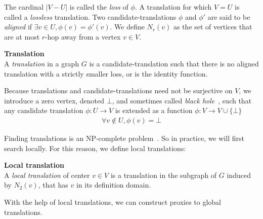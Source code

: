 The cardinal $|V-U|$ is called the \emph{loss} of $\phi$.
A translation for which $V=U$ is called a \emph{lossless} translation.
Two candidate-translations $\phi$ and $\phi'$ are said to be \emph{aligned} if $\exists v\in U, \phi(v) = \phi'(v)$.
We define $N_r(v)$ as the set of vertices that are at most $r$-hop away from a vertex $v \in V$.\\

\begin{definition}\textbf{Translation}\\
  A \emph{translation} in a graph $G$ is a candidate-translation such that there is no aligned translation with a strictly smaller loss, or is the identity function.
\end{definition}


Because translations and candidate-translations need not be surjective on $V$, we introduce a zero vertex, denoted $\bot$, and sometimes called \emph{black hole}~\citep{GrePasViaGri201610}, such that any candidate translation $\phi: U \to V$ is extended as a function $\phi: V \to V \cup \{\bot\}$
\begin{gather}
\forall v \notin U, \phi(v) = \bot
\end{gather}

Finding translations is an NP-complete problem~\citep{pasdeloup2017translations}. So in practice, we will first search locally. For this reason, we define local translations:

\begin{definition}\textbf{Local translation}\\
A \emph{local translation} of center $v \in V$ is a translation in the subgraph of $G$ induced by $N_2(v)$, that has $v$ in its definition domain.
\end{definition}

With the help of local translations, we can construct proxies to global translations.

